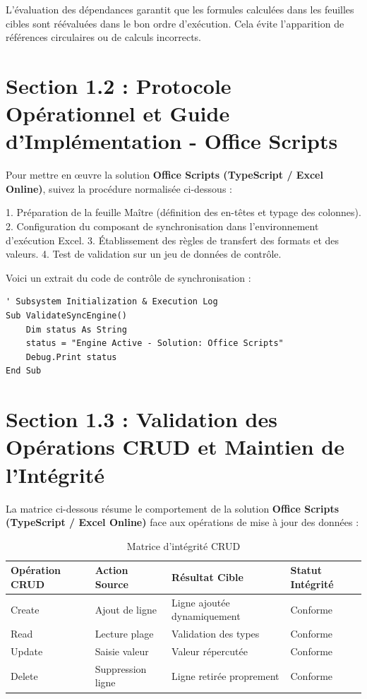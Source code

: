 \documentclass[12pt,a4paper]{report}
\begin{document}
L'évaluation des dépendances garantit que les formules calculées dans les feuilles cibles sont réévaluées dans le bon ordre d'exécution. Cela évite l'apparition de références circulaires ou de calculs incorrects.


\section{Section 1.2 : Protocole Opérationnel et Guide d'Implémentation - Office Scripts}
Pour mettre en œuvre la solution \textbf{Office Scripts (TypeScript / Excel Online)}, suivez la procédure normalisée ci-dessous :

1. Préparation de la feuille Maître (définition des en-têtes et typage des colonnes).
2. Configuration du composant de synchronisation dans l'environnement d'exécution Excel.
3. Établissement des règles de transfert des formats et des valeurs.
4. Test de validation sur un jeu de données de contrôle.

Voici un extrait du code de contrôle de synchronisation :
\begin{lstlisting}[caption=Code de controle operationnel]
' Subsystem Initialization & Execution Log
Sub ValidateSyncEngine()
    Dim status As String
    status = "Engine Active - Solution: Office Scripts"
    Debug.Print status
End Sub
\end{lstlisting}


\section{Section 1.3 : Validation des Opérations CRUD et Maintien de l'Intégrité}
La matrice ci-dessous résume le comportement de la solution \textbf{Office Scripts (TypeScript / Excel Online)} face aux opérations de mise à jour des données :

\begin{table}[h]
\centering
\begin{tabular}{@{}llll@{}}
\toprule
\textbf{Opération CRUD} & \textbf{Action Source} & \textbf{Résultat Cible} & \textbf{Statut Intégrité} \\ \midrule
Create & Ajout de ligne & Ligne ajoutée dynamiquement & Conforme \\
Read & Lecture plage & Validation des types & Conforme \\
Update & Saisie valeur & Valeur répercutée & Conforme \\
Delete & Suppression ligne & Ligne retirée proprement & Conforme \\ \bottomrule
\end{tabular}
\caption{Matrice d'intégrité CRUD}
\end{table}
\end{document}
